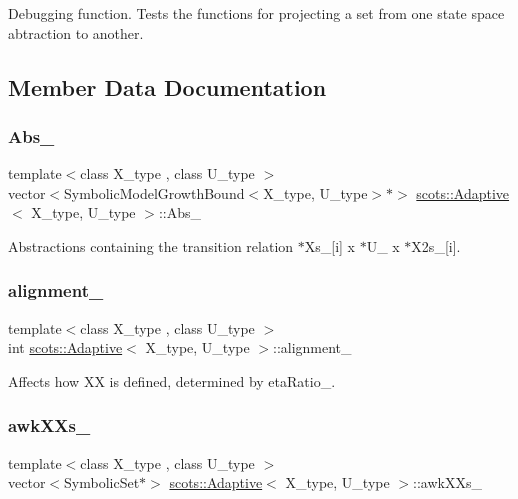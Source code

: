 Debugging function. Tests the functions for projecting a set from one state space abtraction to another. 

\subsection{Member Data Documentation}
\mbox{\label{classscots_1_1Adaptive_ab51fe5639ecc8fd046c1d2d56fb25890}} 
\subsubsection{\texorpdfstring{Abs\+\_\+}{Abs\_}}
{\footnotesize\ttfamily template$<$class X\+\_\+type , class U\+\_\+type $>$ \\
vector$<$Symbolic\+Model\+Growth\+Bound$<$X\+\_\+type, U\+\_\+type$>$$\ast$$>$ \hyperlink{classscots_1_1Adaptive}{scots\+::\+Adaptive}$<$ X\+\_\+type, U\+\_\+type $>$\+::Abs\+\_\+}

Abstractions containing the transition relation  $\ast$\+Xs\+\_\+\mbox{[}i\mbox{]} x $\ast$\+U\+\_\+ x $\ast$\+X2s\+\_\+\mbox{[}i\mbox{]}. \mbox{\label{classscots_1_1Adaptive_ad4f525a5a65b284da14369a54532cf39}} 
\subsubsection{\texorpdfstring{alignment\+\_\+}{alignment\_}}
{\footnotesize\ttfamily template$<$class X\+\_\+type , class U\+\_\+type $>$ \\
int \hyperlink{classscots_1_1Adaptive}{scots\+::\+Adaptive}$<$ X\+\_\+type, U\+\_\+type $>$\+::alignment\+\_\+}

Affects how XX is defined, determined by eta\+Ratio\+\_\+. \mbox{\label{classscots_1_1Adaptive_ae7e9ac7e500e7f06931138b68ad48aac}} 
\subsubsection{\texorpdfstring{awk\+X\+Xs\+\_\+}{awkXXs\_}}
{\footnotesize\ttfamily template$<$class X\+\_\+type , class U\+\_\+type $>$ \\
vector$<$Symbolic\+Set$\ast$$>$ \hyperlink{classscots_1_1Adaptive}{scots\+::\+Adaptive}$<$ X\+\_\+type, U\+\_\+type $>$\+::awk\+X\+Xs\+\_\+}

